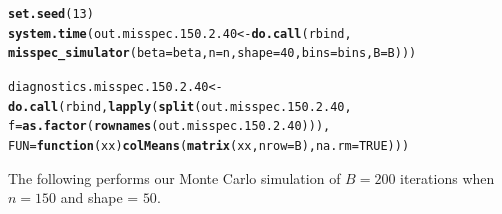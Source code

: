 \documentclass[11pt]{article}\usepackage[]{graphicx}\usepackage[]{color}
\makeatletter
\newcommand{\hlnum}[1]{\textcolor[rgb]{0.686,0.059,0.569}{#1}}%
\newcommand{\hlstd}[1]{\textcolor[rgb]{0.345,0.345,0.345}{#1}}%
\newcommand{\hlkwa}[1]{\textcolor[rgb]{0.161,0.373,0.58}{\textbf{#1}}}%
\newcommand{\hlkwb}[1]{\textcolor[rgb]{0.69,0.353,0.396}{#1}}%
\newcommand{\hlkwc}[1]{\textcolor[rgb]{0.333,0.667,0.333}{#1}}%
\newcommand{\hlkwd}[1]{\textcolor[rgb]{0.737,0.353,0.396}{\textbf{#1}}}%
\newenvironment{kframe}{%
 \def\at@end@of@kframe{}%
 \ifinner\ifhmode%
  \def\at@end@of@kframe{\end{minipage}}%
  \begin{minipage}{\columnwidth}%
 \fi\fi%
 \def\FrameCommand##1{\hskip\@totalleftmargin \hskip-\fboxsep
 \colorbox{shadecolor}{##1}\hskip-\fboxsep
     \hskip-\linewidth \hskip-\@totalleftmargin \hskip\columnwidth}%
 \MakeFramed {\advance\hsize-\width
   \@totalleftmargin\z@ \linewidth\hsize
   \@setminipage}}%
 {\par\unskip\endMakeFramed%
 \at@end@of@kframe}
\newenvironment{knitrout}{}{} %
\makeatother
\begin{document}
\begin{knitrout}
\color{fgcolor}\begin{kframe}
\begin{alltt}
\hlkwd{set.seed}\hlstd{(}\hlnum{13}\hlstd{)}
\hlkwd{system.time}\hlstd{(out.misspec.150.2.40} \hlkwb{<-} \hlkwd{do.call}\hlstd{(rbind,}
  \hlkwd{misspec_simulator}\hlstd{(}\hlkwc{beta} \hlstd{= beta,} \hlkwc{n} \hlstd{= n,} \hlkwc{shape} \hlstd{=} \hlnum{40}\hlstd{,} \hlkwc{bins} \hlstd{= bins,} \hlkwc{B} \hlstd{= B)))}
\end{alltt}


{\ttfamily\noindent\bfseries\color{errorcolor}{\#\# Error in chol.default(crossprod(x) + lambda[j] * diag(v)): the leading minor of order 5 is not positive definite}}

{\ttfamily\noindent\itshape\color{messagecolor}{\#\# Timing stopped at: 0.67 0 0.67}}\begin{alltt}
\hlstd{diagnostics.misspec.150.2.40} \hlkwb{<-} \hlkwd{do.call}\hlstd{(rbind,} \hlkwd{lapply}\hlstd{(}\hlkwd{split}\hlstd{(out.misspec.150.2.40,}
  \hlkwc{f} \hlstd{=} \hlkwd{as.factor}\hlstd{(}\hlkwd{rownames}\hlstd{(out.misspec.150.2.40))),}
  \hlkwc{FUN} \hlstd{=} \hlkwa{function}\hlstd{(}\hlkwc{xx}\hlstd{)} \hlkwd{colMeans}\hlstd{(}\hlkwd{matrix}\hlstd{(xx,} \hlkwc{nrow} \hlstd{= B),} \hlkwc{na.rm} \hlstd{=} \hlnum{TRUE}\hlstd{)))}
\end{alltt}


{\ttfamily\noindent\bfseries\color{errorcolor}{\#\# Error in split(out.misspec.150.2.40, f = as.factor(rownames(out.misspec.150.2.40))): object 'out.misspec.150.2.40' not found}}\end{kframe}
\end{knitrout}


The following performs our Monte Carlo simulation of $B = 200$ iterations 
when $n = 150$ and shape = $50$.
\end{document}
